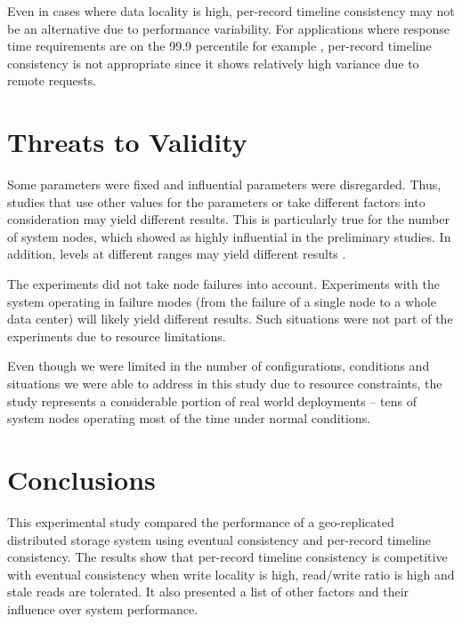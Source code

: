 \documentclass[man,floatsintext,12pt]{apa6}
\begin{document}
Even in cases where data locality is high, per-record timeline consistency may
not be an alternative due to performance variability. For applications where
response time requirements are on the 99.9 percentile for example
\parencite{DeCandia2007}, per-record timeline consistency is not appropriate
since it shows relatively high variance due to remote requests.

\label{threats_to_validity}
\section{Threats to Validity}

Some parameters were fixed and influential parameters were disregarded. Thus,
studies that use other values for the parameters or take different factors into
consideration may yield different results. This is particularly true for the
number of system nodes, which showed as highly influential in the preliminary
studies. In addition, levels at different ranges may yield different results
\parencite{Jain1991}.

The experiments did not take node failures into account. Experiments with the
system operating in failure modes (from the failure of a single node to a
whole data center) will likely yield different results. Such situations were
not part of the experiments due to resource limitations.

Even though we were limited in the number of configurations, conditions and
situations we were able to address in this study due to resource constraints,
the study represents a considerable portion of real world deployments -- tens
of system nodes operating most of the time under normal conditions.

\section{Conclusions}

This experimental study compared the performance of a geo-replicated
distributed storage system using eventual consistency and per-record timeline
consistency. The results show that per-record timeline consistency is
competitive with eventual consistency when write locality is high, read/write
ratio is high and stale reads are tolerated. It also presented a list of other
factors and their influence over system performance.
\end{document}
